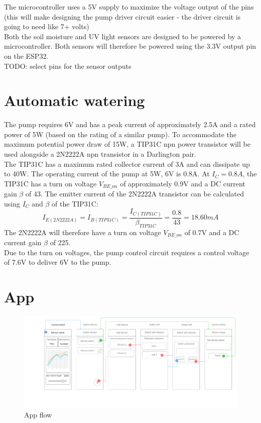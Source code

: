 The microcontroller uses a 5V supply to maximize the voltage output of the pins (this will make designing the pump driver circuit easier - the driver circuit is going to need like 7+ volts)
\\


Both the soil moisture and UV light sensors are designed to be powered by a microcontroller. Both sensors will therefore be powered using the 3.3V output pin on the ESP32. 
\\

TODO: select pins for the sensor outputs

\section{Automatic watering}
The pump requires 6V and has a peak current of approximately 2.5A and a rated power of 5W (based on the rating of a similar pump). To accommodate the maximum potential power draw of 15W, a TIP31C npn power transistor will be used alongside a 2N2222A npn transistor in a Darlington pair. 
\\
The TIP31C has a maximum rated collector current of 3A and can dissipate up to 40W. The operating current of the pump at 5W, 6V is 0.8A. At \(I_C = 0.8A\), the TIP31C has a turn on voltage \(V_{BE\_on}\) of approximately 0.9V and a DC current gain \(\beta\) of 43. The emitter current of the 2N2222A transistor can be calculated using \(I_C\) and \(\beta\) of the TIP31C: 
\[I_{E(2N2222A)} = I_{B(TIP31C)} = \frac{I_{C(TIP31C)}}{\beta_{TIP31C}} = \frac{0.8}{43} = 18.60mA\]
The 2N2222A will therefore have a turn on voltage \(V_{BE\_on}\) of 0.7V and a DC current gain \(\beta\) of 225. 
\\

Due to the turn on voltages, the pump control circuit requires a control voltage of 7.6V to deliver 6V to the pump. 
\section{App}

\begin{figure}[!h]
    \centering
    \includegraphics[width= \textwidth]{Report/detail_design/fig/app_flow.png}
    \caption{App flow}
    \label{fig:app_flow}
\end{figure}

